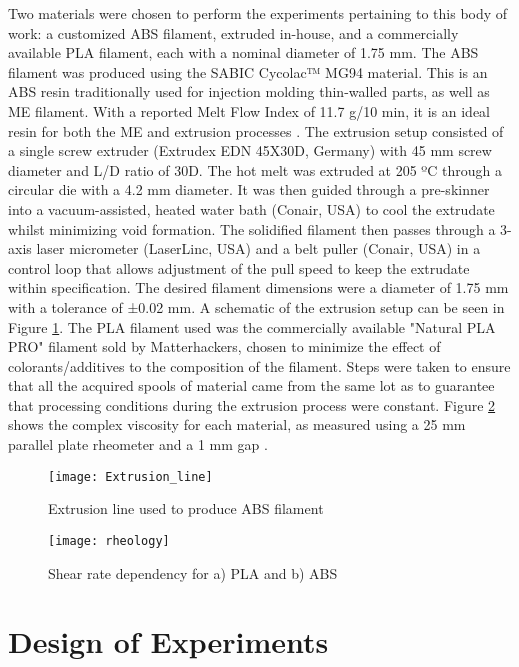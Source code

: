 \documentclass[main.tex]{subfiles}
\begin{document}
Two materials were chosen to perform the experiments pertaining to this body of work: a customized ABS filament, extruded in-house, and a commercially available PLA filament, each with a nominal diameter of 1.75 mm. The ABS filament was produced using the SABIC Cycolac™ MG94 material. This is an ABS resin traditionally used for injection molding thin-walled parts, as well as ME filament. With a reported Melt Flow Index of 11.7 g/10 min, it is an ideal resin for both the ME and extrusion processes \cite{sabic2016}. The extrusion setup consisted of a single screw extruder (Extrudex EDN 45X30D, Germany) with 45 mm screw diameter and L/D ratio of 30D. The hot melt was extruded at 205 ºC through a circular die with a 4.2 mm diameter. It was then guided through a pre-skinner into a vacuum-assisted, heated water bath (Conair, USA) to cool the extrudate whilst minimizing void formation. The solidified filament then passes through a 3-axis laser micrometer (LaserLinc, USA) and a belt puller (Conair, USA) in a control loop that allows adjustment of the pull speed to keep the extrudate within specification. The desired filament dimensions were a diameter of 1.75 mm with a tolerance of ±0.02 mm. A schematic of the extrusion setup can be seen in Figure \ref{fig:ex_line}. The PLA filament used was the commercially available "Natural PLA PRO" filament sold by Matterhackers, chosen to minimize the effect of colorants/additives to the composition of the filament. Steps were taken to ensure that all the acquired spools of material came from the same lot as to guarantee that processing conditions during the extrusion process were constant. Figure \ref{fig:rheo} shows the complex viscosity for each material, as measured using a 25 mm parallel plate rheometer and a 1 mm gap \cite{ColonQuintana2020}.

\begin{figure}[!htbp]
	\center
	\texttt{[image: Extrusion\_line]}
	\caption{Extrusion line used to produce ABS filament} \label{fig:ex_line}
\end{figure}

\begin{figure}[!htbp]
	\center
	\texttt{[image: rheology]}
	\caption{Shear rate dependency for a) PLA and b) ABS} \label{fig:rheo}
\end{figure}

\section{Design of Experiments} \label{sec:doe_data_ex}
\end{document}
